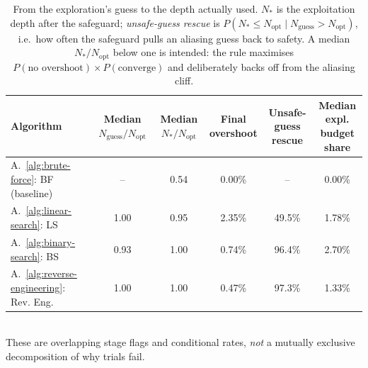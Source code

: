 \begin{table}[ht]
\centering
\small
\caption{From the exploration's guess to the depth actually used. $N_*$ is the exploitation depth after the safeguard; \emph{unsafe-guess rescue} is $P(N_* \le N_{\mathrm{opt}} \mid N_{\mathrm{guess}} > N_{\mathrm{opt}})$, i.e.\ how often the safeguard pulls an aliasing guess back to safety. A median $N_*/N_{\mathrm{opt}}$ below one is intended: the rule maximises $P(\text{no overshoot})\times P(\text{converge})$ and deliberately backs off from the aliasing cliff.}
\label{tab:diag-downstream}
\begin{tabular}{lccccc}
\toprule
Algorithm
& \makecell{Median \\ $N_{\mathrm{guess}}/N_{\mathrm{opt}}$}
& \makecell{Median \\ $N_*/N_{\mathrm{opt}}$}
& \makecell{Final \\ overshoot}
& \makecell{Unsafe-guess \\ rescue}
& \makecell{Median expl. \\ budget share} \\
\midrule
A.~\ref{alg:brute-force}: BF (baseline)
& --
& 0.54
& 0.00\%
& --
& 0.00\% \\
A.~\ref{alg:linear-search}: LS
& 1.00
& 0.95
& 2.35\%
& 49.5\%
& 1.78\% \\
A.~\ref{alg:binary-search}: BS
& 0.93
& 1.00
& 0.74\%
& 96.4\%
& 2.70\% \\
A.~\ref{alg:reverse-engineering}: Rev. Eng.
& 1.00
& 1.00
& 0.47\%
& 97.3\%
& 1.33\% \\
\bottomrule
\end{tabular}
\\[2pt]
\footnotesize These are overlapping stage flags and conditional rates, \emph{not} a mutually exclusive decomposition of why trials fail.
\end{table}
